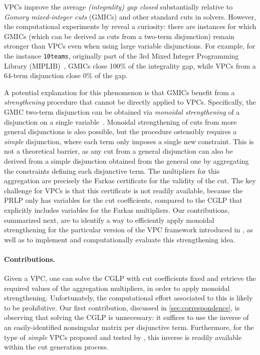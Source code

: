 \documentclass[oribibl,envcountsame]{llncs}
\theoremstyle{remark}
\theoremstyle{definition}
\newcommand{\instance}[1]{\texttt{#1}}
\begin{document}
VPCs improve the average \emph{(integrality) gap closed} substantially relative to \emph{Gomory mixed-integer cuts} (GMICs) and other standard cuts in solvers.
However, the computational experiments by \citet{BalKaz22+_vpc-arxiv} reveal a curiosity: there are instances for which GMICs (which can be derived as cuts from a two-term disjunction) remain stronger than VPCs even when using large variable disjunctions.
For example, for the instance \instance{10teams}, originally part of the 3rd Mixed Integer Programming Library (MIPLIB)~\cite{MIPLIB3}, GMICs close 100\% of the integrality gap, while VPCs from a 64-term disjunction close 0\% of the gap.

A potential explanation for this phenomenon is that GMICs benefit from a \emph{strengthening} procedure that cannot be directly applied to VPCs.
Specifically, the GMIC two-term disjunction can be obtained via \emph{monoidal strengthening} of a disjunction on a single variable~\cite{BalJer80, BalPer03, KazSer23}.
Monoidal strengthening of cuts from more general disjunctions is also possible, but the procedure ostensibly requires a \emph{simple} disjunction, where each term only imposes a single new constraint.
This is not a theoretical barrier, as any cut from a general disjunction can also be derived from a simple disjunction obtained from the general one by aggregating the constraints defining each disjunctive term.
The multipliers for this aggregation are precisely the Farkas certificate for the validity of the cut.
The key challenge for VPCs is that this certificate is not readily available, because the PRLP only has variables for the cut coefficients,
compared to the CGLP that explicitly includes variables for the Farkas multipliers.
Our contributions, summarized next, are to identify a way to efficiently apply monoidal strengthening for the particular version of the VPC framework introduced in \citet{BalKaz22+_vpc-arxiv}, as well as to implement and computationally evaluate this strengthening idea.

\paragraph{Contributions.}
Given a VPC, one can solve the CGLP with cut coefficients fixed and retrieve the required values of the aggregation multipliers, in order to apply monoidal strengthening.
Unfortunately, the computational effort associated to this is likely to be prohibitive.
Our first contribution, discussed in \cref{sec:correspondence}, is observing that solving the CGLP is unnecessary: it suffices to use the inverse of an easily-identified nonsingular matrix per disjunctive term.
Furthermore, for the type of \emph{simple} VPCs proposed and tested by \citet{BalKaz22+_vpc-arxiv}, this inverse is readily available within the cut generation process.
\end{document}
